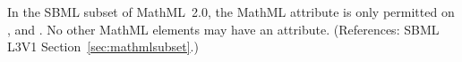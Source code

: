 In the SBML subset of MathML~2.0, the MathML attribute
 is only permitted on ,
 and .  No other
MathML elements may have an  attribute.
(References: SBML L3V1 Section~\ref{sec:mathmlsubset}.)
